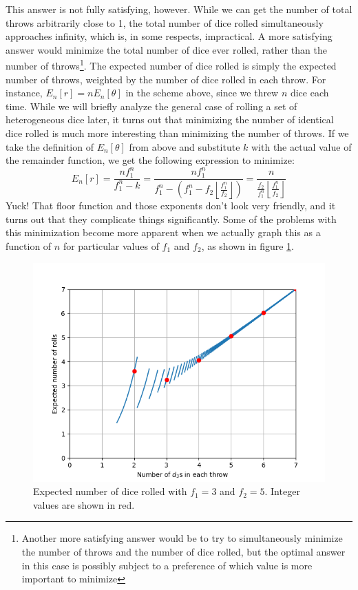 \documentclass{article}
\begin{document}
\par This answer is not fully satisfying, however.
While we can get the number of total throws arbitrarily close to 1, the total number of dice rolled simultaneously approaches infinity, which is, in some respects, impractical.
A more satisfying answer would minimize the total number of dice ever rolled, rather than the number of throws\footnote{Another more satisfying answer would be to try to simultaneously minimize the number of throws and the number of dice rolled, but the optimal answer in this case is possibly subject to a preference of which value is more important to minimize}.
The expected number of dice rolled is simply the expected number of throws, weighted by the number of dice rolled in each throw.
For instance, $E_n[r] = nE_n[\theta]$ in the scheme above, since we threw $n$ dice each time.
While we will briefly analyze the general case of rolling a set of heterogeneous dice later, it turns out that minimizing the number of identical dice rolled is much more interesting than minimizing the number of throws.
If we take the definition of $E_n[\theta]$ from above and substitute $k$ with the actual value of the remainder function, we get the following expression to minimize: $$E_n[r] = \frac{nf_1^n}{f_1^n-k} = \frac{nf_1^n}{f_1^n-\left(f_1^n - f_2 \left \lfloor \frac{f_1^n}{f_2} \right \rfloor \right)} = \frac{n}{\frac{f_2}{f_1^n} \left \lfloor \frac{f_1^n}{f_2} \right \rfloor}$$ 
Yuck! 
That floor function and those exponents don't look very friendly, and it turns out that they complicate things significantly.
Some of the problems with this minimization become more apparent when we actually graph this as a function of $n$ for particular values of $f_1$ and $f_2$, as shown in figure \ref{fig:num-rolls}.
\begin{figure}
    \centering
    \includegraphics[scale=0.5]{num-rolls.png}
    \caption{Expected number of dice rolled with $f_1=3$ and $f_2=5$. Integer values are shown in red.}
    \label{fig:num-rolls}
\end{figure}
\end{document}

